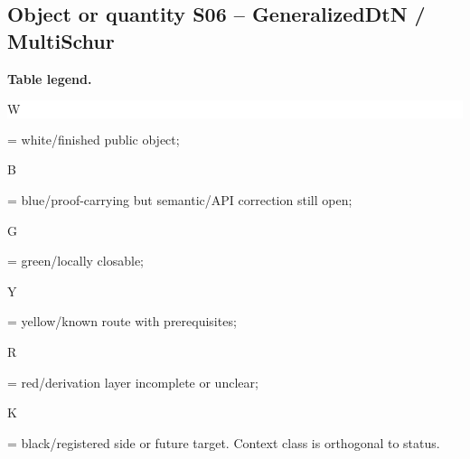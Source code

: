 \subsection*{Object or quantity S06 -- GeneralizedDtN /\allowbreak{} MultiSchur}
\hypertarget{objproof:S06}{}
\par\smallskip\noindent\begin{minipage}{0.99\linewidth}\footnotesize\raggedright\textbf{Table legend.} \colorbox{white}{\strut W} = white/finished public object; \colorbox{cyan!20}{\strut B} = blue/proof-carrying but semantic/API correction still open; \colorbox{green!18}{\strut G} = green/locally closable; \colorbox{yellow!25}{\strut Y} = yellow/known route with prerequisites; \colorbox{red!20}{\strut R} = red/derivation layer incomplete or unclear; \colorbox{black!18}{\strut K} = black/registered side or future target. Context class is orthogonal to status.\end{minipage}\par\vspace{0.25em}
